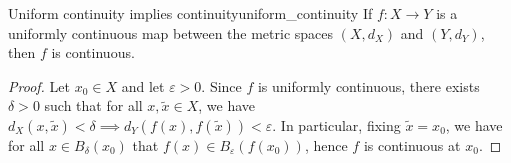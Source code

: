 \begin{proposition}{Uniform continuity implies continuity}{uniform_continuity}
    If \(f : X \to Y\) is a uniformly continuous map between the metric spaces \((X, d_X)\) and \((Y, d_Y)\), then \(f\) is continuous.
\end{proposition}
\begin{proof}
    Let \(x_0 \in X\) and let \(\varepsilon > 0\). Since \(f\) is uniformly continuous, there exists \(\delta > 0\) such that for all \(x,\tilde{x} \in X\), we have \(d_X(x, \tilde{x}) < \delta \implies d_Y(f(x), f(\tilde{x})) < \varepsilon\). In particular, fixing \(\tilde{x} = x_0\), we have for all \(x \in B_\delta(x_0)\) that \(f(x) \in B_\varepsilon(f(x_0))\), hence \(f\) is continuous at \(x_0\).
\end{proof}

